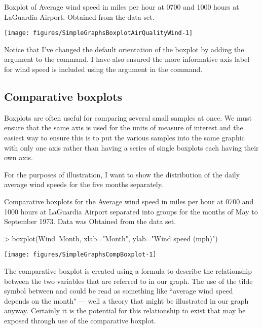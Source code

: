 \begin{exhibit} 
\begin{center} 
\caption{Boxplot of Average wind speed in miles per hour at 0700 and 1000 hours at LaGuardia Airport. Obtained from the  data set.} 
\label{AirQualityBoxplot} 

\texttt{[image: figures/SimpleGraphsBoxplotAirQualityWind-1]} 


\end{center} 
\end{exhibit} 
 
Notice that I've changed the default orientation of the boxplot by adding the argument  to the  command. I have also ensured the more informative axis label for wind speed is included using the  argument in the command. 
 
\subsection{Comparative boxplots} 
 
Boxplots are often useful for comparing several small samples at once. We must ensure that the same axis is used for the units of measure of interest and the easiest way to ensure this is to put the various samples into the same graphic with only one axis rather than having a series of single boxplots each having their own axis. 
 
For the purposes of illustration, I want to show the distribution of the daily average wind speeds for the five months separately.  
\begin{exhibit} 
\begin{center} 
\caption{Comparative boxplots for the Average wind speed in miles per hour at 0700 and 1000 hours at LaGuardia Airport separated into groups for the months of May to September 1973. Data was Obtained from the  data set.} 
\label{AirQualityCompBoxplotWindMonth} 
\begin{Schunk}
\begin{Sinput}
> boxplot(Wind~Month, xlab="Month", ylab="Wind speed (mph)") 
\end{Sinput}

\texttt{[image: figures/SimpleGraphsCompBoxplot-1]} \end{Schunk}
\end{center} 
\end{exhibit} 
The comparative boxplot is created using a formula to describe the relationship between the two variables that are referred to in our graph. The use of the tilde symbol between  and  could be read as something like ``average wind speed depends on the month" --- well a theory that might be illustrated in our graph anyway. Certainly it is the potential for this relationship to exist that may be exposed through use of the comparative boxplot. 
 
